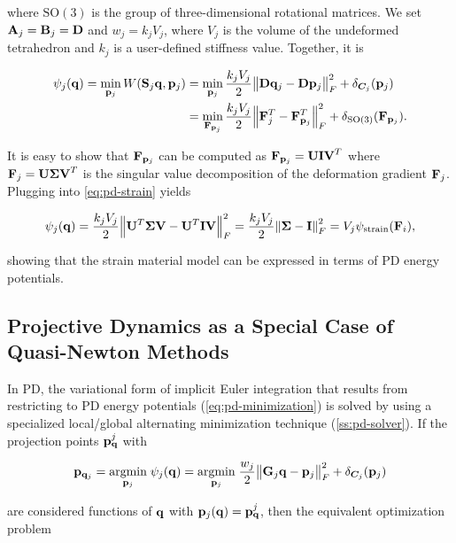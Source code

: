 \noindent where $\text{SO}(3)$ is the group of three-dimensional rotational matrices. We set $\mathbf{A}_j = \mathbf{B}_j = \mathbf{D}$ and $w_j = k_jV_j$, 
where $V_j$ is the volume of the undeformed tetrahedron and $k_j$ is a user-defined stiffness value. Together, it is

\begin{align}
    \begin{split}\label{eq:pd-strain}    
    \psi_j(\mathbf{q}) 
    = \min_{\mathbf{p}_j} W(\mathbf{S}_j\mathbf{q}, \mathbf{p}_j) 
    &= \min_{\mathbf{p}_j} \frac{k_jV_j}{2} \norm{\mathbf{D}\mathbf{q}_j - \mathbf{D}\mathbf{p}_j}^2_F + \delta_{\bm{C}_j}(\mathbf{p}_j) \\
    &= \min_{\mathbf{F}_{\mathbf{p}_j}} \frac{k_jV_j}{2} \norm{\mathbf{F}_j^T - \mathbf{F}_{\mathbf{p}_j}^T}^2_F + \delta_{\text{SO}(3)}(\mathbf{F}_{\mathbf{p}_j}).
    \end{split}
\end{align}

\noindent It is easy to show that $\mathbf{F}_{\mathbf{p}_j}$ can be computed as $\mathbf{F}_{\mathbf{p}_j} = \mathbf{UIV}^T$ where $\mathbf{F}_j = 
\mathbf{U \Sigma V}^T$ is the singular value decomposition of the deformation gradient $\mathbf{F}_j$. Plugging into \autoref{eq:pd-strain}
yields

\[
    \psi_j(\mathbf{q}) = \frac{k_jV_j}{2} \norm{\mathbf{U}^T\mathbf{\Sigma}\mathbf{V} - \mathbf{U}^T\mathbf{I}\mathbf{V}}^2_F 
    = \frac{k_jV_j}{2} \norm{\mathbf{\Sigma} - \mathbf{I}}^2_F = V_j \psi_{\text{strain}}(\mathbf{F}_i),
\]

\noindent showing that the strain material model can be expressed in terms of PD energy potentials.

\subsection{Projective Dynamics as a Special Case of Quasi-Newton Methods}\label{ss:pd-quasi-newton}
In PD, the variational form of implicit Euler integration that results from restricting to PD energy potentials (\cref{eq:pd-minimization}) 
is solved by using a specialized local/global alternating minimization technique (\cref{ss:pd-solver}). If the projection points 
$\mathbf{p}^j_{\mathbf{q}}$ with 

\[
    \mathbf{p}_{\mathbf{q}_j} 
    = \underset{\mathbf{p}_j}{\operatorname{argmin}}\; \psi_j(\mathbf{q}) 
    = \underset{\mathbf{p}_j}{\operatorname{argmin}}\; \frac{w_j}{2} \norm{\mathbf{G}_j\mathbf{q} - \mathbf{p}_j}^2_F + \delta_{\bm{C}_j}(\mathbf{p}_j)
\]

\noindent are considered functions of $\mathbf{q}$ with $\mathbf{p}_j(\mathbf{q}) = \mathbf{p}^j_{\mathbf{q}}$, then the equivalent optimization problem

